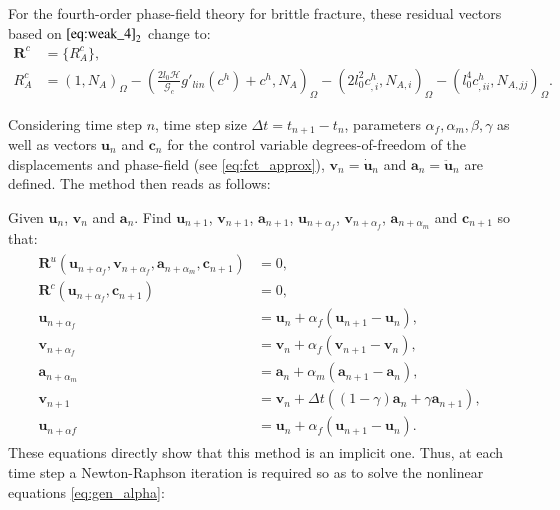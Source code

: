 For the fourth-order phase-field theory for brittle fracture, these residual vectors based on $\eqref{eq:weak_4}_{2}$ change to:
\begin{equation} \label{eq:res_vecs_c4}
	\begin{aligned}
		\mathbf{R}^{c}&=\{R_{A}^{c}\}, \\
		R_{A}^{c} &= \left(1,N_{A}\right)_{\Omega} - \left(\frac{2l_{0}\mathcal{H}}{\mathcal{G}_{c}}g'_{lin}\left(c^{h}\right) + c^{h},N_{A}\right)_{\Omega} - \left(2l_{0}^{2}c^{h}_{,i},N_{A,i}\right)_{\Omega} - \left(l_{0}^{4}c^{h}_{,ii},N_{A,jj}\right)_{\Omega}.
	\end{aligned}
\end{equation}


Considering time step $n$, time step size $\Delta t = t_{n+1}-t_{n}$, parameters $\alpha_{f},\alpha_{m},\beta,\gamma$ as well as vectors $\mathbf{u}_{n}$ and $\mathbf{c}_{n}$ for the control variable degrees-of-freedom of the displacements and phase-field (see \eqref{eq:fct_approx}), $\textbf{v}_{n}=\dot{\mathbf{u}}_{n}$ and $\mathbf{a}_{n}=\ddot{\mathbf{u}}_{n}$ are defined. The method then reads as follows:

Given $\mathbf{u}_{n}$, $\mathbf{v}_{n}$ and $\mathbf{a}_{n}$. Find $\mathbf{u}_{n+1}$, $\mathbf{v}_{n+1}$, $\mathbf{a}_{n+1}$, $\mathbf{u}_{n+\alpha_{f}}$, $\mathbf{v}_{n+\alpha_{f}}$, $\mathbf{a}_{n+\alpha_{m}}$ and $\mathbf{c}_{n+1}$ so that:
\begin{equation} \label{eq:gen_alpha}
\begin{aligned}
\begin{alignedat}{1}
        \mathbf{R}^{u}\left(\mathbf{u}_{n+\alpha_{f}},\mathbf{v}_{n+\alpha_{f}},\mathbf{a}_{n+\alpha_{m}},\mathbf{c}_{n+1}\right) &= 0, \\
    	\mathbf{R}^{c}\left(\mathbf{u}_{n+\alpha_{f}},\mathbf{c}_{n+1}\right) &= 0, \\
        \mathbf{u}_{n+\alpha_{f}} &= \mathbf{u}_{n}+\alpha_{f}\left(\mathbf{u}_{n+1}-\mathbf{u}_{n}\right), \\      
        \mathbf{v}_{n+\alpha_{f}} &= \mathbf{v}_{n}+\alpha_{f}\left(\mathbf{v}_{n+1}-\mathbf{v}_{n}\right), \\
        \mathbf{a}_{n+\alpha_{m}} &= \mathbf{a}_{n}+\alpha_{m}\left(\mathbf{a}_{n+1}-\mathbf{a}_{n}\right), \\
        \mathbf{v}_{n+1} &= \mathbf{v}_{n}+\Delta t\left(\left(1-\gamma\right)\mathbf{a}_{n}+\gamma\mathbf{a}_{n+1}\right), \\  
        \mathbf{u}_{n+\alpha f} &= \mathbf{u}_{n}+\alpha_{f}\left(\mathbf{u}_{n+1}-\mathbf{u}_{n}\right).
\end{alignedat}
\end{aligned}
\end{equation}
These equations directly show that this method is an implicit one. Thus, at each time step a Newton-Raphson iteration is required so as to solve the nonlinear equations \eqref{eq:gen_alpha}:

